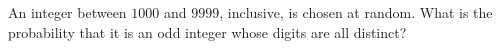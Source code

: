 An integer between $1000$ and $9999$, inclusive, is chosen at random. What is the probability that it is an odd integer whose digits are all distinct?
